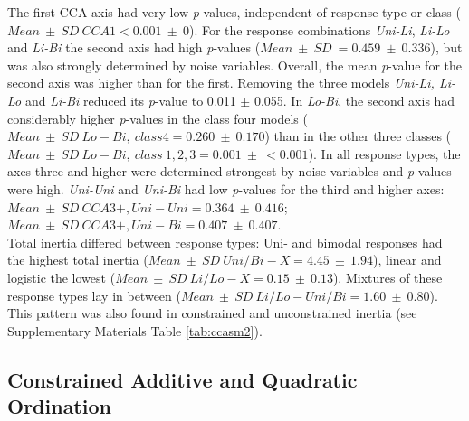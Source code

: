 		The first CCA axis had very low \textit{p}-values, independent of response type or class ($Mean\ \pm\ SD\ \scriptscriptstyle CCA1 \textstyle < 0.001\ \pm\ 0$). 
		For the response combinations \textit{Uni-Li}, \textit{Li-Lo} and \textit{Li-Bi} the second axis had high \textit{p}-values ($Mean\ \pm\ SD\ =  0.459\ \pm\ 0.336$), but was also strongly determined by noise variables.
		Overall, the mean \textit{p}-value for the second axis was higher than for the first.
		Removing the three models \textit{Uni-Li, Li-Lo} and \textit{Li-Bi} reduced its \textit{p}-value to 0.011 $\pm$ 0.055. 
		In \textit{Lo-Bi}, the second axis had considerably higher \textit{p}-values in the class four models 
		($Mean\ \pm\ SD\ \scriptscriptstyle Lo-Bi,\ class 4 \textstyle = 0.260\ \pm\ 0.170$)
		than in the other three classes  
		($Mean\ \pm\ SD\ \scriptscriptstyle Lo-Bi,\ class\ 1,2,3 \textstyle = 0.001\ \pm\ < 0.001$). 
		In all response types, the axes three and higher were determined strongest by noise variables and \textit{p}-values were high. 
		\textit{Uni-Uni} and \textit{Uni-Bi} had low \textit{p}-values for the third and higher axes: 
		$Mean\ \pm\ SD\ \scriptscriptstyle CCA3+, Uni-Uni \textstyle = 0.364\ \pm\ 0.416$;
		$Mean\ \pm\ SD\ \scriptscriptstyle CCA3+, Uni-Bi  \textstyle = 0.407\ \pm\ 0.407$.\\
		
		
		Total inertia differed between response types: Uni- and bimodal responses had the highest total inertia ($Mean\ \pm\ SD\ \scriptscriptstyle Uni/Bi-X \textstyle = 4.45\ \pm\ 1.94$), linear and logistic the lowest ($Mean\ \pm\ SD\ \scriptscriptstyle Li/Lo-X \textstyle = 0.15\ \pm\ 0.13$). 
		Mixtures of these response types lay in between ($Mean\ \pm\ SD\ \scriptscriptstyle Li/Lo-Uni/Bi\textstyle = 1.60\ \pm\ 0.80$).
		This pattern was also found in constrained and unconstrained inertia (see Supplementary Materials Table \ref{tab:ccasm2}).

	
	\subsection{Constrained Additive and Quadratic Ordination}
	
